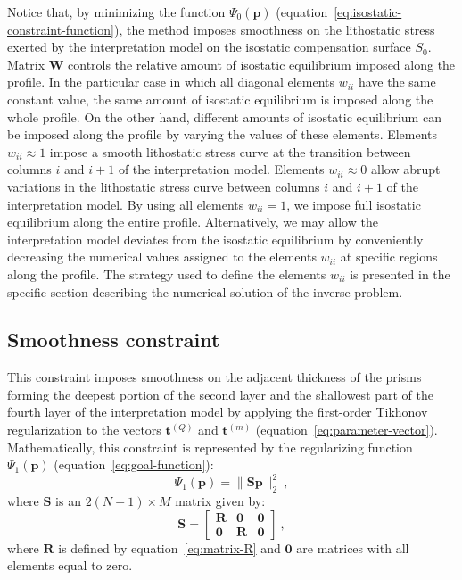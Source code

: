 \documentclass[manuscript]{geophysics}
\begin{document}
Notice that, by minimizing the function $\Psi_{0}(\mathbf{p})$ 
(equation~\ref{eq:isostatic-constraint-function}), the method imposes smoothness on 
the lithostatic stress exerted by the interpretation model on the isostatic 
compensation surface $S_{0}$.
Matrix $\mathbf{W}$ controls the relative amount of isostatic equilibrium imposed 
along the profile. 
In the particular case in which all diagonal elements $w_{ii}$ have the same
constant value, the same amount of isostatic equilibrium is imposed along the 
whole profile. On the other hand, different amounts of isostatic equilibrium
can be imposed along the profile by varying the values of these elements.
Elements $w_{ii} \approx 1$ impose a smooth lithostatic stress curve 
at the transition between columns $i$ and $i+1$ of the interpretation model.
Elements $w_{ii} \approx 0$ allow abrupt variations in the lithostatic stress 
curve between columns $i$ and $i+1$ of the interpretation model.
By using all elements $w_{ii} = 1$, we impose full isostatic equilibrium 
along the entire profile. Alternatively, we may allow the interpretation model 
deviates from the isostatic equilibrium by conveniently decreasing the numerical values
assigned to the elements $w_{ii}$ at specific regions along the profile. 
The strategy used to define the elements $w_{ii}$ is 
presented in the specific section describing the numerical solution of the inverse problem.


\subsection{Smoothness constraint}


This constraint imposes smoothness on the adjacent thickness of the prisms forming the
deepest portion of the second layer and the shallowest part of the fourth layer
of the interpretation model by applying the first-order Tikhonov regularization
\citep{aster-etal2005} to the vectors $\mathbf{t}^{(Q)}$ and $\mathbf{t}^{(m)}$ 
(equation~\ref{eq:parameter-vector}). 
Mathematically, this constraint is represented by the regularizing function
$\Psi_{1}(\mathbf{p})$ (equation~\ref{eq:goal-function}):
\begin{equation}
\Psi_{1}(\mathbf{p}) = \| \mathbf{S}\mathbf{p} \|_{2}^{2} \: ,
\label{eq:smootheness-contraint}
\end{equation}
where $\mathbf{S}$ is an $2 \left( N-1 \right) \times M$ matrix given by:
\begin{equation}
\mathbf{S} = \begin{bmatrix}
\mathbf{R} & \mathbf{0} & \mathbf{0} \\
\mathbf{0} & \mathbf{R} & \mathbf{0}
\end{bmatrix} \: ,
\label{eq:matrix-S}
\end{equation}
where $\mathbf{R}$ is defined by equation~\ref{eq:matrix-R} and $\mathbf{0}$
are matrices with all elements equal to zero.
\end{document}

